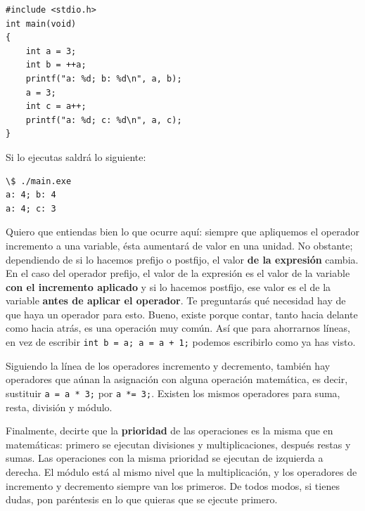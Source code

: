 \documentclass[a4paper]{article}
\begin{document}
\noindent
\begin{minipage}[H]{\linewidth}
\mbox{}
\begin{lstlisting}[style=C, caption={Operadores de incremento y decremento},
label={lst:prefixAndPostfixOperators}]
#include <stdio.h>
int main(void)
{
    int a = 3;
    int b = ++a;
    printf("a: %d; b: %d\n", a, b);
    a = 3;
    int c = a++;
    printf("a: %d; c: %d\n", a, c);
}
\end{lstlisting}
\end{minipage}


Si lo ejecutas saldrá lo siguiente:


\noindent
\begin{minipage}[H]{\linewidth}
\mbox{}
\begin{lstlisting}[style=terminalStyle]
\$ ./main.exe
a: 4; b: 4
a: 4; c: 3
\end{lstlisting}
\end{minipage}


Quiero que entiendas bien lo que ocurre aquí: siempre que apliquemos el
operador incremento a una variable, ésta aumentará de valor en una unidad.
No obstante;
dependiendo de si lo hacemos prefijo o postfijo, el valor \textbf{de la
expresión} cambia. En el caso del operador prefijo, el valor de la expresión es
el valor de la variable \textbf{con el incremento aplicado} y si lo hacemos
postfijo, ese valor es el de la variable \textbf{antes de aplicar el operador}.
Te preguntarás qué necesidad hay de que haya un operador para esto. Bueno,
existe porque contar, tanto hacia delante como hacia atrás, es una operación
muy común. Así que para ahorrarnos líneas, en vez de escribir
\lstinline[style=C]!int b = a; a = a + 1;! podemos escribirlo como ya has
visto.

Siguiendo la línea de los operadores incremento y decremento, también hay
operadores que aúnan la asignación con alguna operación matemática, es decir,
sustituir \lstinline[style=C]!a = a * 3;! por
\lstinline[style=C]!a *= 3;!. Existen los mismos operadores para suma, resta,
división y módulo.

Finalmente, decirte que la \textbf{prioridad} de las operaciones es la misma
que en matemáticas: primero se ejecutan divisiones y multiplicaciones, después
restas y sumas. Las operaciones con la misma prioridad se ejecutan de izquierda
a derecha. El módulo está al mismo nivel que la multiplicación, y los operadores
de incremento y decremento siempre van los primeros. De todos modos, si tienes
dudas, pon paréntesis en lo que quieras que se ejecute primero.
\end{document}
